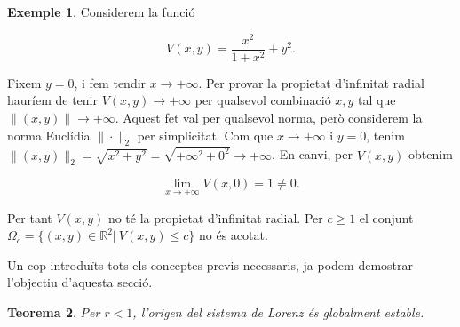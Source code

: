\documentclass[11pt,a4paper,openright,oneside]{article}
\numberwithin{equation}{section}
\newtheorem{teo}{Teorema}[section]
\theoremstyle{definition}
\newtheorem{ex}[teo]{Exemple}
\begin{document}
\begin{ex}
    Considerem la funció 
    
    \begin{equation*}
        V(x,y)=\frac{x^2}{1+x^2}+y^2.
    \end{equation*}

    Fixem $y=0$, i fem tendir $x \to +\infty$. Per provar la propietat d'infinitat radial hauríem de tenir $V(x,y) \to +\infty$ per qualsevol combinació $x, y$ tal que $\| (x, y) \| \to +\infty$. Aquest fet val per qualsevol norma, però considerem la norma Euclídia $\| \cdot \|_2$ per simplicitat. Com que $x\to +\infty$ i $y = 0$, tenim $\|(x,y)\|_2 = \sqrt{x^2 + y^2} = \sqrt{+\infty^2 + 0^2}\to +\infty$. En canvi, per $V(x,y)$ obtenim

    \begin{equation*}
        \lim_{x \to +\infty}V(x,0) = 1 \neq 0.
    \end{equation*}

    Per tant $V(x,y)$ no té la propietat d'infinitat radial. Per $c \geq 1$ el conjunt $\Omega_c=\{(x,y) \in \mathbb{R}^2 | \ V(x,y) \leq c\}$ no és acotat.
\end{ex}

Un cop introduïts tots els conceptes previs necessaris, ja podem demostrar l'objectiu d'aquesta secció.

\begin{teo}\label{teo:glestable}
    Per $r<1$, l'origen del sistema de Lorenz és globalment estable.
\end{teo}
\end{document}
